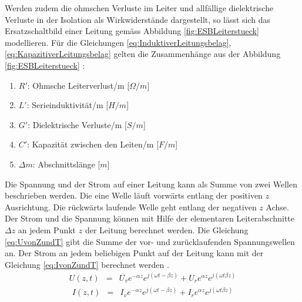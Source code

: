 Werden zudem die ohmschen Verluste im Leiter und allfällige dielektrische Verluste in der Isolation als Wirkwiderstände dargestellt, so lässt sich das Ersatzschaltbild einer Leitung gemäss Abbildung \ref{fig:ESBLeiterstueck} modellieren.
Für die Gleichungen \ref{eq:InduktiverLeitungsbelag}, \ref{eq:KapazitiverLeitungsbelag} gelten die Zusammenhänge aus der Abbildung \ref{fig:ESBLeiterstueck}  \cite{Tekom}:
\begin{enumerate}[leftmargin=2cm]
   \item[] $R'$: Ohmsche Leiterverlust/m [$\Omega/m$] 
   \item[] $L'$: Serieinduktivität/m  [$H/m$] 
   \item[] $G'$: Dielektrische Verluste/m  [$S/m$] 
   \item[] $C'$: Kapazität zwischen den Leiten/m  [$F/m$] 
   \item[] $\Delta m$: Abschnittslänge  [$m$] 
\end{enumerate} 
Die Spannung und der Strom auf einer Leitung kann als Summe von zwei Wellen beschrieben werden. Die eine Welle läuft vorwärts entlang der positiven $z$ Ausrichtung. Die rückwärts laufende Welle geht entlang der negativen $z$ Achse. Der Strom und die Spannung können mit Hilfe der elementaren Leiterabschnitte $\Delta z$ an jedem Punkt $z$  der Leitung berechnet werden. Die Gleichung \ref{eq:UvonZundT} gibt die Summe der vor- und zurücklaufenden Spannungswellen an. Der Strom an jedem beliebigen Punkt auf der Leitung kann mit der Gleichung \ref{eq:IvonZundT} berechnet werden \cite{Tekom}.
\begin{eqnarray}\label{eq:UvonZundT}
U(z,t) &=& U_{v}e^{-\alpha z}e^{j(\omega t -\beta z)}+U_{r}e^{\alpha z}e^{j(\omega t \beta z)}
\end{eqnarray}
\begin{eqnarray}\label{eq:IvonZundT}
I(z,t) &=& I_{v}e^{-\alpha z}e^{j(\omega t -\beta z)}+I_{r}e^{\alpha z}e^{j(\omega t \beta z)}
\end{eqnarray}

